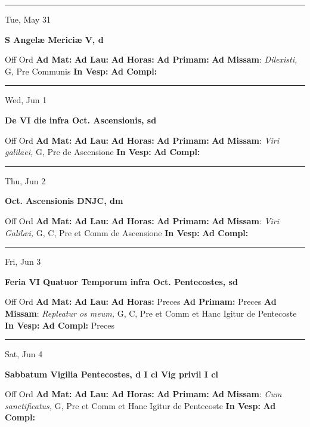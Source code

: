 \documentclass[letterpaper, 10pt]{article}
\begin{document}
\hrule
\begin{center}
Tue, May 31
\end{center}\textbf{ \large S Angelæ Mericiæ V, \textnormal{\normalsize d}}
\begin{justify}
Off Ord
\textbf{Ad Mat: }
\textbf{Ad Lau: }
\textbf{Ad Horas: }
\textbf{Ad Primam: }
\textbf{Ad Missam}: \textit{Dilexisti,} G, Pre Communis
\textbf{In Vesp: }
\textbf{Ad Compl: }\end{justify}



\hrule
\begin{center}
Wed, Jun 1
\end{center}\textbf{ \large De VI die infra Oct. Ascensionis, \textnormal{\normalsize sd}}
\begin{justify}
Off Ord
\textbf{Ad Mat: }
\textbf{Ad Lau: }
\textbf{Ad Horas: }
\textbf{Ad Primam: }
\textbf{Ad Missam}: \textit{Viri galilaei,} G, Pre de Ascensione
\textbf{In Vesp: }
\textbf{Ad Compl: }\end{justify}



\hrule
\begin{center}
Thu, Jun 2
\end{center}\textbf{ \large Oct. Ascensionis DNJC, \textnormal{\normalsize dm}}
\begin{justify}
Off Ord
\textbf{Ad Mat: }
\textbf{Ad Lau: }
\textbf{Ad Horas: }
\textbf{Ad Primam: }
\textbf{Ad Missam}: \textit{Viri Galilæi,} G, C, Pre et Comm de Ascensione
\textbf{In Vesp: }
\textbf{Ad Compl: }\end{justify}



\hrule
\begin{center}
Fri, Jun 3
\end{center}\textbf{ \large Feria VI Quatuor Temporum infra Oct. Pentecostes, \textnormal{\normalsize sd}}
\begin{justify}
Off Ord
\textbf{Ad Mat: }
\textbf{Ad Lau: }
\textbf{Ad Horas: }Preces
\textbf{Ad Primam: }Preces
\textbf{Ad Missam}: \textit{Repleatur os meum,} G, C, Pre et Comm et Hanc Igitur de Pentecoste
\textbf{In Vesp: }
\textbf{Ad Compl: }Preces\end{justify}



\hrule
\begin{center}
Sat, Jun 4
\end{center}\textbf{ \large Sabbatum Vigilia Pentecostes, \textnormal{\normalsize d I cl Vig privil I cl}}
\begin{justify}
Off Ord
\textbf{Ad Mat: }
\textbf{Ad Lau: }
\textbf{Ad Horas: }
\textbf{Ad Primam: }
\textbf{Ad Missam}: \textit{Cum sanctificatus,} G, Pre et Comm et Hanc Igitur de Pentecoste
\textbf{In Vesp: }
\textbf{Ad Compl: }\end{justify}
\end{document}
